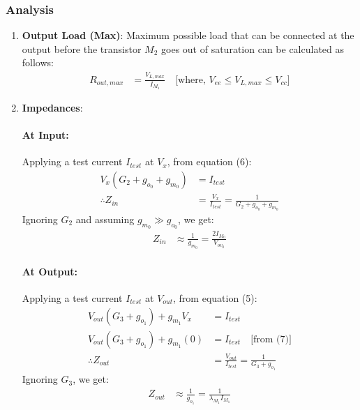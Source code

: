 \subsubsection{Analysis}
\begin{enumerate}
  \item \textbf{Output Load (Max)}: Maximum possible
    load that can be connected at the output before
    the transistor $M_2$ goes out of saturation can
    be calculated as follows:
    \begin{align*}
      R_{out, max} &= \frac{V_{L, max}}{I_{M_1}} \quad \text{[where, } V_{ee} \leq V_{L, max} \leq V_{cc} \text{]}
    \end{align*}
  \item \textbf{Impedances}:
    \paragraph{At Input:} Applying a test current $I_{test}$
      at $V_{x}$, from equation (6):
      \begin{align*}
        V_{x}(G_2 + g_{o_0} + g_{m_0}) &= I_{test} \\
        \therefore Z_{in} &= \frac{V_{x}}{I_{test}} = \frac{1}{G_2 + g_{o_0} + g_{m_0}}
      \end{align*}
      Ignoring $G_2$ and assuming $g_{m_0} \gg g_{o_0}$, we get:
      \begin{align*}
        Z_{in} &\approx \frac{1}{g_{m_0}} = \frac{2 I_{M_0}}{V_{ov_0}}
      \end{align*}
    \paragraph{At Output:} Applying a test current $I_{test}$
      at $V_{out}$, from equation (5):
      \begin{align*}
        V_{out}(G_3 + g_{o_1}) + g_{m_1}V_{x} &= I_{test} \\
        V_{out}(G_3 + g_{o_1}) + g_{m_1}(0) &= I_{test} \quad \text{[from (7)]} \\
        \therefore Z_{out} &= \frac{V_{out}}{I_{test}} = \frac{1}{G_3 + g_{o_1}}
      \end{align*}
      Ignoring $G_3$, we get:
      \begin{align*}
        Z_{out} &\approx \frac{1}{g_{o_1}} = \frac{1}{\lambda_{M_1} I_{M_1}}
      \end{align*}
\end{enumerate}

